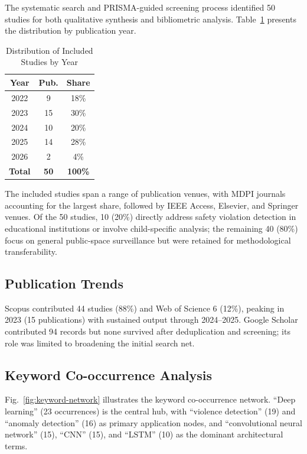 \documentclass[conference]{IEEEtran}
\begin{document}
The systematic search and PRISMA-guided screening process identified 50 studies for both qualitative synthesis and bibliometric analysis. Table~\ref{tab:years} presents the distribution by publication year.

\begin{table}[t]
\caption{Distribution of Included Studies by Year}
\begin{center}
\renewcommand{\arraystretch}{1.0}
\begin{tabular}{|c|c|c|}
\hline
\textbf{Year} & \textbf{Pub.} & \textbf{Share} \\
\hline
2022 & 9 & 18\% \\
2023 & 15 & 30\% \\
2024 & 10 & 20\% \\
2025 & 14 & 28\% \\
2026 & 2 & 4\% \\
\hline
\textbf{Total} & \textbf{50} & \textbf{100\%} \\
\hline
\end{tabular}
\label{tab:years}
\end{center}
\end{table}

The included studies span a range of publication venues, with MDPI journals accounting for the largest share, followed by IEEE Access, Elsevier, and Springer venues. Of the 50 studies, 10 (20\%) directly address safety violation detection in educational institutions or involve child-specific analysis; the remaining 40 (80\%) focus on general public-space surveillance but were retained for methodological transferability.

\subsection{Publication Trends}

Scopus contributed 44 studies (88\%) and Web of Science 6 (12\%), peaking in 2023 (15 publications) with sustained output through 2024--2025. Google Scholar contributed 94 records but none survived after deduplication and screening; its role was limited to broadening the initial search net.

\subsection{Keyword Co-occurrence Analysis}

Fig.~\ref{fig:keyword-network} illustrates the keyword co-occurrence network. ``Deep learning'' (23 occurrences) is the central hub, with ``violence detection'' (19) and ``anomaly detection'' (16) as primary application nodes, and ``convolutional neural network'' (15), ``CNN'' (15), and ``LSTM'' (10) as the dominant architectural terms.
\end{document}
